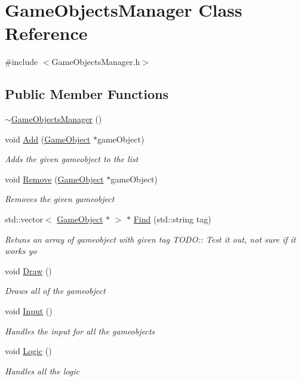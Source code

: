 \hypertarget{class_game_objects_manager}{}\section{Game\+Objects\+Manager Class Reference}
\label{class_game_objects_manager}


{\ttfamily \#include $<$Game\+Objects\+Manager.\+h$>$}

\subsection*{Public Member Functions}
\begin{DoxyCompactItemize}
\item 
\mbox{\hyperlink{class_game_objects_manager_abe5aece84355a01f2473b41217f28026}{$\sim$\+Game\+Objects\+Manager}} ()
\item 
void \mbox{\hyperlink{class_game_objects_manager_acfdcf84bfdb4705920585b2d04bb874e}{Add}} (\mbox{\hyperlink{class_game_object}{Game\+Object}} $\ast$game\+Object)
\begin{DoxyCompactList}\small\item\em Adds the given gameobject to the list \end{DoxyCompactList}\item 
void \mbox{\hyperlink{class_game_objects_manager_a9c000e81eed9c5fd9dd374411271cbde}{Remove}} (\mbox{\hyperlink{class_game_object}{Game\+Object}} $\ast$game\+Object)
\begin{DoxyCompactList}\small\item\em Removes the given gameobject \end{DoxyCompactList}\item 
std\+::vector$<$ \mbox{\hyperlink{class_game_object}{Game\+Object}} $\ast$ $>$ $\ast$ \mbox{\hyperlink{class_game_objects_manager_a242d9459669f0d2e13df6f98c1c04b8a}{Find}} (std\+::string tag)
\begin{DoxyCompactList}\small\item\em Retuns an array of gameobject with given tag T\+O\+DO\+:\+: Test it out, not sure if it works yo \end{DoxyCompactList}\item 
void \mbox{\hyperlink{class_game_objects_manager_a60c1378f98fbef5dc98c8fdd094ef3c9}{Draw}} ()
\begin{DoxyCompactList}\small\item\em Draws all of the gameobject \end{DoxyCompactList}\item 
void \mbox{\hyperlink{class_game_objects_manager_a9f5ca8d981a423e9c5ab56978a1cd99e}{Input}} ()
\begin{DoxyCompactList}\small\item\em Handles the input for all the gameobjects \end{DoxyCompactList}\item 
void \mbox{\hyperlink{class_game_objects_manager_ac77aa52afc2dfbb678c51a27022fc60a}{Logic}} ()
\begin{DoxyCompactList}\small\item\em Handles all the logic \end{DoxyCompactList}\end{DoxyCompactItemize}

